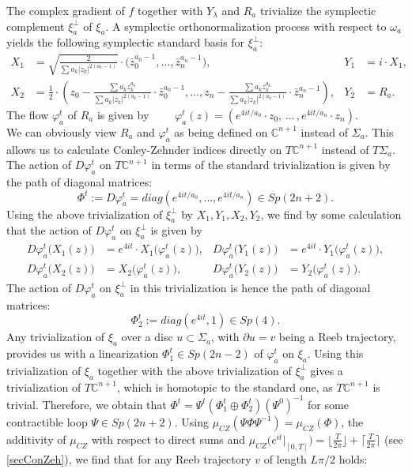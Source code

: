 \documentclass[a4paper,12pt,bibliography=totocnumbered,titlepage=false,abstracton,bookmarksnumbered=true]{scrartcl}
\theoremstyle{definition}
\begin{document}
The complex gradient of $f$ together with $Y_\lambda$ and $R_a$ trivialize the symplectic complement $\xi_a^\bot$ of $\xi_a$. A symplectic orthonormalization process with respect to $\omega_a$ yields the following symplectic standard basis for $\xi_a^\bot$:
\begin{align*}
 X_1 &= \sqrt{\frac{2}{\sum a_k|z_k|^{2(a_k-1)}}}\cdot \Big( \bar{z}_0^{a_0-1},\dots,\bar{z}_n^{a_n-1}\Big),&Y_1&=i\cdot X_1,\\
 X_2 &= \frac{1}{2}\cdot\left(z_0-\frac{\sum a_kz_k^{a_k}}{\sum a_k|z_k|^{2(a_k-1)}}\cdot \bar{z}_0^{a_0-1} , \dots,z_n-\frac{\sum a_kz_k^{a_k}}{\sum a_k|z_k|^{2(a_k-1)}}\cdot \bar{z}_n^{a_n-1}\right),&Y_2&=R_a.
\end{align*}
The flow $\varphi^t_a$ of $R_a$ is given by $\qquad\displaystyle\varphi^t_a(z)=\left(e^{4it/a_0}\cdot z_0,\,\dots\,,e^{4it/a_n}\cdot z_n\right)$.\bigskip\\
We can obviously view $R_a$ and $\varphi_a^t$ as being defined on $\mathbb{C}^{n+1}$ instead of $\Sigma_a$. This allows us to calculate Conley-Zehnder indices directly on $T\mathbb{C}^{n+1}$ instead of $T\Sigma_a$. The action of $D\varphi_a^t$ on $T\mathbb{C}^{n+1}$ in terms of the standard trivialization is given by the path of diagonal matrices:
\[\Phi^t:=D\varphi^t_a = diag\left( e^{4it/a_0},\dots,e^{4it/a_n}\right)\in Sp(2n+2).\]
Using the above trivialization of $\xi_a^\bot$ by $X_1,Y_1,X_2,Y_2$, we find by some calculation that the action of $D\varphi_a^t$ on $\xi_a^\bot$ is given by
\begin{align*}
 D\varphi^t_a\bigl( X_1(z)\bigr) &= e^{4it}\cdot X_1\bigl( \varphi^t_a(z)\bigr), & D\varphi^t_a \bigl( Y_1(z)\bigr) &= e^{4it}\cdot Y_1\bigl( \varphi^t_a(z)\bigr),\\
 D\varphi^t_a\bigl( X_2(z)\bigr) &= X_2\bigl(\varphi^t_a(z)\bigr), & D\varphi^t_a\bigl( Y_2(z)\bigr) &= Y_2\bigl(\varphi^t_a(z)\bigr).
\end{align*}
The action of $D\varphi_a^t$ on $\xi_a^\bot$ in this trivialization is hence the path of diagonal matrices:
\[\Phi^t_2:=diag (e^{4it}, 1)\in Sp(4).\]
Any trivialization of $\xi_a$ over a disc $u\subset\Sigma_a$, with $\partial u=v$ being a Reeb trajectory, provides us with a linearization $\Phi^t_1\in Sp(2n-2)$ of $\varphi^t_a$ on $\xi_a$. Using this trivialization of $\xi_a$ together with the above trivialization of $\xi^\bot_a$ gives a trivialization of $T\mathbb{C}^{n+1}$, which is homotopic to the standard one, as $T\mathbb{C}^{n+1}$ is trivial. Therefore, we obtain that $\Phi^t = \Psi^t(\Phi^t_1{\oplus} \Phi^t_2)(\Psi^0)^{-1}$ for some contractible loop $\Psi\in Sp(2n{+}2)$. Using $\mu_{CZ}(\Psi\Phi\Psi^{-1})=\mu_{CZ}(\Phi)$, the additivity of $\mu_{CZ}$ with respect to direct sums and $\mu_{CZ}\big(e^{it}|_{[0, T]}\big)=\big\lfloor\frac{T}{2\pi}\big\rfloor{+}\big\lceil\frac{T}{2\pi}\big\rceil$ (see \ref{secConZeh}), we find that for any Reeb trajectory $v$ of length $L\pi/2$ holds:
\end{document}
